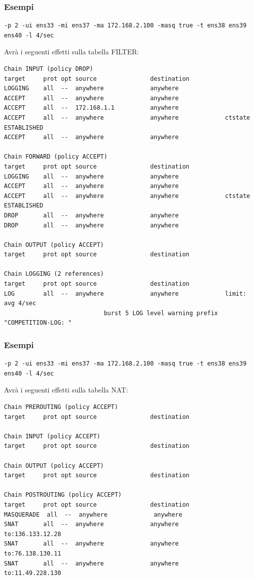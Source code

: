 \documentclass{beamer}
\begin{document}
\begin{frame}[fragile]
    \frametitle{Esempi}
    \begin{lstlisting}
-p 2 -ui ens33 -mi ens37 -ma 172.168.2.100 -masq true -t ens38 ens39 ens40 -l 4/sec
    \end{lstlisting}
    Avrà i seguenti effetti sulla tabella FILTER:
    \begin{lstlisting}
Chain INPUT (policy DROP)
target     prot opt source               destination         
LOGGING    all  --  anywhere             anywhere            
ACCEPT     all  --  anywhere             anywhere            
ACCEPT     all  --  172.168.1.1          anywhere            
ACCEPT     all  --  anywhere             anywhere             ctstate ESTABLISHED
ACCEPT     all  --  anywhere             anywhere            

Chain FORWARD (policy ACCEPT)
target     prot opt source               destination         
LOGGING    all  --  anywhere             anywhere            
ACCEPT     all  --  anywhere             anywhere            
ACCEPT     all  --  anywhere             anywhere             ctstate ESTABLISHED
DROP       all  --  anywhere             anywhere            
DROP       all  --  anywhere             anywhere            

Chain OUTPUT (policy ACCEPT)
target     prot opt source               destination         

Chain LOGGING (2 references)
target     prot opt source               destination         
LOG        all  --  anywhere             anywhere             limit: avg 4/sec 
                            burst 5 LOG level warning prefix "COMPETITION-LOG: "
    \end{lstlisting}
\end{frame}

\begin{frame}[fragile]
    \frametitle{Esempi}
    \begin{lstlisting}
-p 2 -ui ens33 -mi ens37 -ma 172.168.2.100 -masq true -t ens38 ens39 ens40 -l 4/sec
    \end{lstlisting}
    Avrà i seguenti effetti sulla tabella NAT:
    \begin{lstlisting}
Chain PREROUTING (policy ACCEPT)
target     prot opt source               destination         

Chain INPUT (policy ACCEPT)
target     prot opt source               destination         

Chain OUTPUT (policy ACCEPT)
target     prot opt source               destination         

Chain POSTROUTING (policy ACCEPT)
target     prot opt source               destination         
MASQUERADE  all  --  anywhere             anywhere            
SNAT       all  --  anywhere             anywhere             to:136.133.12.28
SNAT       all  --  anywhere             anywhere             to:76.138.130.11
SNAT       all  --  anywhere             anywhere             to:11.49.228.130
    \end{lstlisting}
\end{frame}
\end{document}

